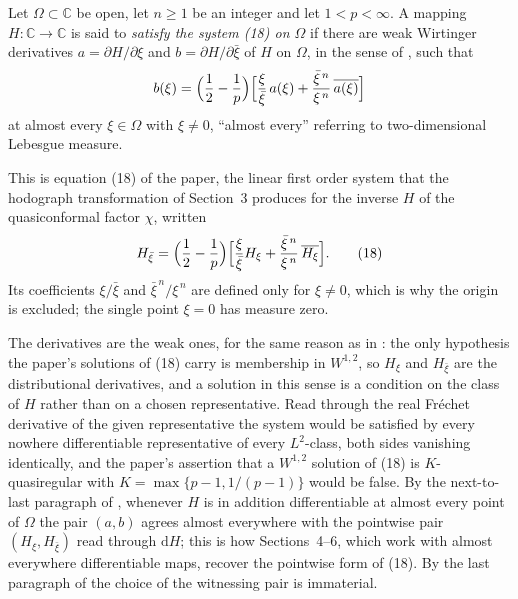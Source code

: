 \begin{definition}
Let $\Omega\subset\mathbb{C}$ be open, let $n\ge1$ be an integer and let
$1<p<\infty$.  A mapping $H\colon\mathbb{C}\to\mathbb{C}$ is said to
\emph{satisfy the system (18) on $\Omega$} if there are weak Wirtinger
derivatives $a=\partial H/\partial\xi$ and
$b=\partial H/\partial\bar\xi$ of $H$ on $\Omega$, in the sense of
, such that
\[
  b(\xi)
  =\Bigl(\frac12-\frac1p\Bigr)
   \Bigl[\frac{\xi}{\bar\xi}\,a(\xi)
     +\frac{\bar\xi^{\,n}}{\xi^{\,n}}\,\overline{a(\xi)}\Bigr]
\]
at almost every $\xi\in\Omega$ with $\xi\neq0$, ``almost every'' referring to
two-dimensional Lebesgue measure.

This is equation (18) of the paper, the linear first order system that the
hodograph transformation of Section~3 produces for the inverse $H$ of the
quasiconformal factor $\chi$, written
\[
  H_{\bar\xi}
  =\Bigl(\frac12-\frac1p\Bigr)
   \Bigl[\frac{\xi}{\bar\xi}H_\xi+\frac{\bar\xi^{\,n}}{\xi^{\,n}}\,\overline{H_\xi}\Bigr].
  \tag{18}
\]
Its coefficients $\xi/\bar\xi$ and $\bar\xi^{\,n}/\xi^{\,n}$ are defined only
for $\xi\neq0$, which is why the origin is excluded; the single point $\xi=0$
has measure zero.

The derivatives are the weak ones, for the same reason as in
: the only hypothesis the paper's solutions of (18)
carry is membership in $W^{1,2}$, so $H_\xi$ and $H_{\bar\xi}$ are the
distributional derivatives, and a solution in this sense is a condition on the
class of $H$ rather than on a chosen representative.  Read through the real
Fr\'echet derivative of the given representative the system would be satisfied
by every nowhere differentiable representative of every $L^2$-class, both
sides vanishing identically, and the paper's assertion that a $W^{1,2}$
solution of (18) is $K$-quasiregular with $K=\max\{p-1,1/(p-1)\}$ would be
false.  By the next-to-last paragraph of , whenever
$H$ is in addition differentiable at almost every point of $\Omega$ the pair
$(a,b)$ agrees almost everywhere with the pointwise pair
$(H_\xi,H_{\bar\xi})$ read through $\mathrm{d}H$; this is how Sections~4--6,
which work with almost everywhere differentiable maps, recover the pointwise
form of (18).  By the last paragraph of  the choice
of the witnessing pair is immaterial.
\end{definition}
